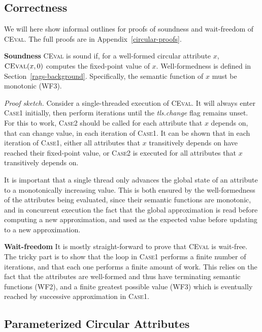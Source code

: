{\subsection{Correctness}
\label{circular-correctness}

We will here show informal outlines for proofs of
soundness and wait-freedom of \textsc{CEval}.
The full proofs are in Appendix~\ref{circular-proofs}.

\textbf{Soundness} \textsc{CEval} is sound if, for a well-formed circular attribute $x$,
$\textsc{CEval}(x, 0)$ computes the fixed-point value of $x$.
Well-formedness is defined in Section~\ref{rags-background}. Specifically,
the semantic function of $x$ must be monotonic (WF3).

\emph{Proof sketch.} Consider a single-threaded execution of \textsc{CEval}. It will always enter \textsc{Case1}
initially, then perform iterations until the \emph{tls.change} flag remains unset.
For this to work,
\textsc{Case2} should be called for each attribute that $x$ depends on, that can change value, in
each iteration of \textsc{Case1}.  It can be shown that in each iteration of \textsc{Case1},
either all attributes that $x$ transitively depends on have reached their fixed-point value, or
\textsc{Case2} is executed for all attributes that $x$ transitively depends on.

It is important that a single thread only advances the global state
of an attribute to a monotonically increasing value.
This is both ensured by the well-formedness of the attributes being evaluated, since
their semantic functions are monotonic, and in concurrent execution the fact that the
global approximation is read before computing a new approximation, and used as the
expected value before updating to a new approximation.

\textbf{Wait-freedom} It is mostly straight-forward to prove that \textsc{CEval}
is wait-free.  The tricky part is to show that
the loop in \textsc{Case1} performs a finite number of iterations,
and that each one performs a finite amount of work.
This relies on the fact that the attributes are well-formed and thus
have terminating semantic functions (WF2), and
a finite greatest possible value (WF3) which is eventually reached by
successive approximation in \textsc{Case1}.

\subsection{Parameterized Circular Attributes}

}
